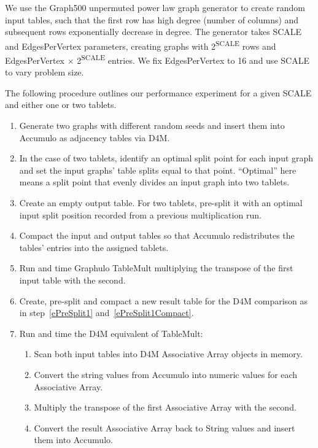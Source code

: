 We use the Graph500 unpermuted power law graph generator \cite{bader2006designing} 
to create random input tables,
such that the first row has high degree (number of columns) 
and subsequent rows exponentially decrease in degree.
The generator takes SCALE and EdgesPerVertex parameters, creating graphs with 2\textsuperscript{SCALE} 
rows and EdgesPerVertex $\times$ 2\textsuperscript{SCALE} entries.
We fix EdgesPerVertex to 16 and use SCALE to vary problem size. 

The following procedure outlines our performance experiment for a given SCALE and either one or two tablets.
\begin{enumerate}
\item Generate two graphs with different random seeds and insert them into Accumulo as adjacency tables via D4M.
\item In the case of two tablets, identify an optimal split point for each input graph
and set the input graphs' table splits equal to that point.
``Optimal'' here means a split point that evenly divides an input graph into two tablets.
\item \label{ePreSplit1} Create an empty output table. For two tablets, pre-split it with 
an optimal input split position recorded from a previous multiplication run.
\item \label{ePreSplit1Compact} Compact the input and output tables 
so that Accumulo redistributes the tables' entries into the assigned tablets.
\item Run and time Graphulo TableMult multiplying the transpose of the first input table with the second.
\item Create, pre-split and compact a new result table for the D4M comparison 
as in step~\ref{ePreSplit1} and~\ref{ePreSplit1Compact}.
\item Run and time the D4M equivalent of TableMult:
 \begin{enumerate}
 \item Scan both input tables into D4M Associative Array objects in \matlab{} memory.
 \item Convert the string values from Accumulo into numeric values for each Associative Array.
 \item Multiply the transpose of the first Associative Array with the second.
 \item Convert the result Associative Array back to String values and insert them into Accumulo.
 \end{enumerate}
\end{enumerate}

